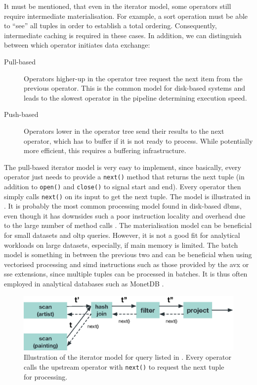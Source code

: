 It must be mentioned, that even in the iterator model, some operators still require intermediate materialisation. For example, a sort operation must be able to ``see'' all tuples in order to establish a total ordering. Consequently, intermediate caching is required in these cases. In addition, we can distinguish between which operator initiates data exchange:

\begin{description}
    \item[Pull-based] Operators higher-up in the operator tree request the next item from the previous operator. This is the common model for disk-based systems and leads to the slowest operator in the pipeline determining execution speed.
    \item[Push-based] Operators lower in the operator tree send their results to the next operator, which has to buffer if it is not ready to process. While potentially more efficient, this requires a buffering infrastructure.
\end{description}

The pull-based iterator model is very easy to implement, since basically, every operator just needs to provide a \texttt{next()} method that returns the next tuple (in addition to \texttt{open()} and \texttt{close()} to signal start and end). Every operator then simply calls  \texttt{next()} on its input to get the next tuple. The model is illustrated in . It is probably the most common processing model found in disk-based \acrshort{dbms}, even though it has downsides such a poor instruction locality and overhead due to the large number of method calls \cite{Neumann:2014Compiling}. The materialisation model can be beneficial for small datasets and \acrshort{oltp} queries. However, it is not a good fit for analytical workloads on large datasets, especially, if main memory is limited. The batch model is something in between the previous two and can be beneficial when using vectorised processing and \acrshort{simd} instructions such as those provided by the \acrshort{avx} or \acrshort{sse} extensions, since multiple tuples can be processed in batches. It is thus often employed in analytical databases such as MonetDB \cite{Idreos:2012MonetDB}.

\begin{figure}[tb]
    \centering
    \includegraphics[width=\textwidth]{figures/iterator-model.eps}
    \caption{Illustration of the iterator model for query listed in . Every operator calls the upstream operator with \texttt{next()} to request the next tuple for processing.}
    \label{figure:iterator_model}
\end{figure}

